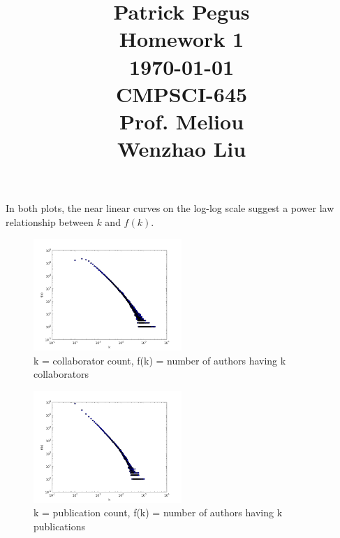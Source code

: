 \documentclass{article}
\begin{document}
\title
{\begin{flushleft}
\normalsize
Patrick Pegus\\
Homework 1\\
\today\\
CMPSCI-645\\
Prof. Meliou\\
Wenzhao Liu
\end{flushleft}}
\author{}
\date{}
\maketitle
In both plots, the near linear curves on the log-log scale suggest a power law relationship between $k$ and $f(k)$.
\begin{figure}[H]
	\centering
	\includegraphics[width=0.5\textwidth]{collabcount.png}
	\caption{k = collaborator count, f(k) = number of authors having k collaborators}
\end{figure}
\begin{figure}[H]
	\centering
	\includegraphics[width=0.5\textwidth]{pubcount.png}
	\caption{k = publication count, f(k) = number of authors having k publications}
\end{figure}
\end{document}
